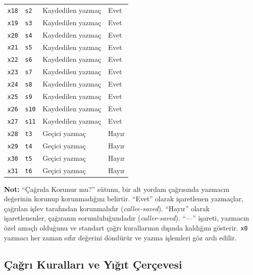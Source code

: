 \begin{table}[H]
{\begin{tabular}{@{}clll@{}}
\midrule
\texttt{x18} & \texttt{s2}     & Kaydedilen yazmaç                             & Evet \\
\texttt{x19} & \texttt{s3}     & Kaydedilen yazmaç                             & Evet \\
\texttt{x20} & \texttt{s4}     & Kaydedilen yazmaç                             & Evet \\
\texttt{x21} & \texttt{s5}     & Kaydedilen yazmaç                             & Evet \\
\texttt{x22} & \texttt{s6}     & Kaydedilen yazmaç                             & Evet \\
\texttt{x23} & \texttt{s7}     & Kaydedilen yazmaç                             & Evet \\
\texttt{x24} & \texttt{s8}     & Kaydedilen yazmaç                             & Evet \\
\texttt{x25} & \texttt{s9}     & Kaydedilen yazmaç                             & Evet \\
\texttt{x26} & \texttt{s10}    & Kaydedilen yazmaç                             & Evet \\
\texttt{x27} & \texttt{s11}    & Kaydedilen yazmaç                             & Evet \\
\midrule
\texttt{x28} & \texttt{t3}     & Geçici yazmaç                                & Hayır \\
\texttt{x29} & \texttt{t4}     & Geçici yazmaç                                & Hayır \\
\texttt{x30} & \texttt{t5}     & Geçici yazmaç                                & Hayır \\
\texttt{x31} & \texttt{t6}     & Geçici yazmaç                                & Hayır \\
\bottomrule
\end{tabular}
}
\end{table}

\noindent
\textbf{Not:} ``Çağrıda Korunur mu?'' sütunu, bir alt yordam çağrısında yazmacın değerinin korunup korunmadığını belirtir. ``Evet'' olarak işaretlenen yazmaçlar, çağrılan işlev tarafından korunmalıdır (\emph{callee-saved}). ``Hayır'' olarak işaretlenenler, çağıranın sorumluluğundadır (\emph{caller-saved}). ``---'' işareti, yazmacın özel amaçlı olduğunu ve standart çağrı kurallarının dışında kaldığını gösterir. \texttt{x0} yazmacı her zaman sıfır değerini döndürür ve yazma işlemleri göz ardı edilir.

\subsection{Çağrı Kuralları ve Yığıt Çerçevesi}
\label{subsec:ekc-cagri-kurallari}


